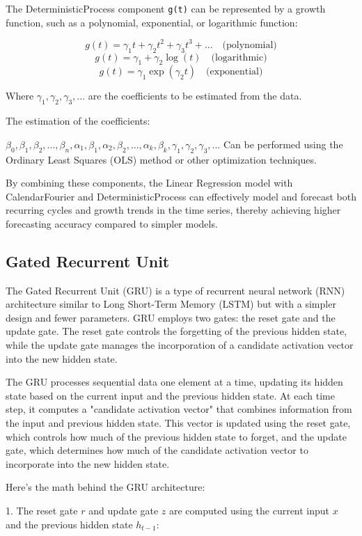\documentclass{ieeeojies}
\begin{document}
The DeterministicProcess component \verb|g(t)| can be represented by a growth function, such as a polynomial, exponential, or logarithmic function:

 $$g(t) = \gamma_1t + \gamma_2t^2 + \gamma_3t^3 + ... \quad \text{(polynomial)}$$
$$g(t) = \gamma_1 + \gamma_2\log(t) \quad \text{(logarithmic)}$$
$$g(t) = \gamma_1\exp(\gamma_2t) \quad \text{(exponential)}$$

Where $\gamma_1, \gamma_2, \gamma_3, ...$ are the coefficients to be estimated from the data.

The estimation of the coefficients:

$\beta_0, \beta_1, \beta_2, ..., \beta_n, \alpha_1, \beta_1, \alpha_2, \beta_2, ..., \alpha_k, \beta_k, \gamma_1, \gamma_2, \gamma_3, ...$ 
Can be performed using the Ordinary Least Squares (OLS) method or other optimization techniques.

 By combining these components, the Linear Regression model with CalendarFourier and DeterministicProcess can effectively model and forecast both recurring cycles and growth trends in the time series, thereby achieving higher forecasting accuracy compared to simpler models. 
 
 \subsection{Gated Recurrent Unit}
 The Gated Recurrent Unit (GRU) is a type of recurrent neural network (RNN) architecture similar to Long Short-Term Memory (LSTM) but with a simpler design and fewer parameters. GRU employs two gates: the reset gate and the update gate. The reset gate controls the forgetting of the previous hidden state, while the update gate manages the incorporation of a candidate activation vector into the new hidden state.

 The GRU processes sequential data one element at a time, updating its hidden state based on the current input and the previous hidden state. At each time step, it computes a "candidate activation vector" that combines information from the input and previous hidden state. This vector is updated using the reset gate, which controls how much of the previous hidden state to forget, and the update gate, which determines how much of the candidate activation vector to incorporate into the new hidden state.

 Here’s the math behind the GRU architecture:

 1. The reset gate \( r \) and update gate \( z \) are computed using the current input \( x \) and the previous hidden state \( h_{t-1} \):
\end{document}
